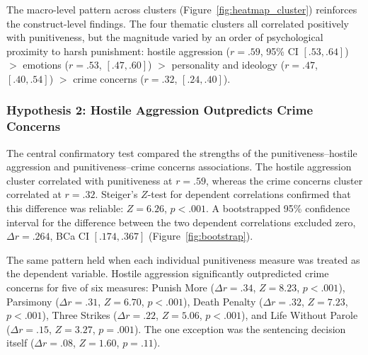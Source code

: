 The macro-level pattern across clusters (Figure~\ref{fig:heatmap_cluster}) reinforces the construct-level findings. The four thematic clusters all correlated positively with punitiveness, but the magnitude varied by an order of psychological proximity to harsh punishment: hostile aggression ($r = .59$, 95\% CI $[.53, .64]$) $>$ emotions ($r = .53$, $[.47, .60]$) $>$ personality and ideology ($r = .47$, $[.40, .54]$) $>$ crime concerns ($r = .32$, $[.24, .40]$).

\subsubsection{Hypothesis 2: Hostile Aggression Outpredicts Crime Concerns}

The central confirmatory test compared the strengths of the punitiveness--hostile aggression and punitiveness--crime concerns associations. The hostile aggression cluster correlated with punitiveness at $r = .59$, whereas the crime concerns cluster correlated at $r = .32$. Steiger's $Z$-test for dependent correlations confirmed that this difference was reliable: $Z = 6.26$, $p < .001$. A bootstrapped 95\% confidence interval for the difference between the two dependent correlations excluded zero, $\Delta r = .264$, BCa CI $[.174, .367]$ (Figure~\ref{fig:bootstrap}).

The same pattern held when each individual punitiveness measure was treated as the dependent variable. Hostile aggression significantly outpredicted crime concerns for five of six measures: Punish More ($\Delta r = .34$, $Z = 8.23$, $p < .001$), Parsimony ($\Delta r = .31$, $Z = 6.70$, $p < .001$), Death Penalty ($\Delta r = .32$, $Z = 7.23$, $p < .001$), Three Strikes ($\Delta r = .22$, $Z = 5.06$, $p < .001$), and Life Without Parole ($\Delta r = .15$, $Z = 3.27$, $p = .001$). The one exception was the sentencing decision itself ($\Delta r = .08$, $Z = 1.60$, $p = .11$).

